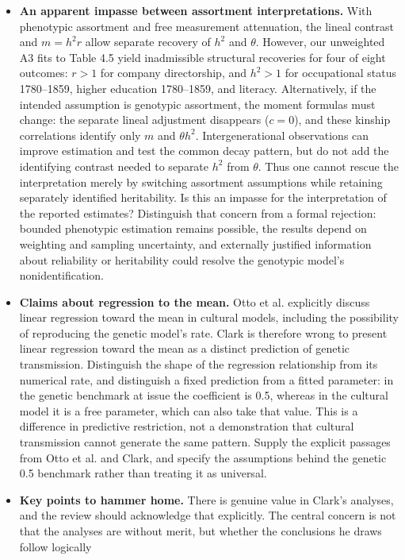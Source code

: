 \begin{itemize}
correlations inferred in Table 5.2.
\item \textbf{An apparent impasse between assortment interpretations.}
With phenotypic assortment and free measurement attenuation, the lineal
contrast and $m=h^2r$ allow separate recovery of $h^2$ and $\theta$.
However, our unweighted A3 fits to Table 4.5 yield inadmissible structural
recoveries for four of eight outcomes: $r>1$ for company directorship,
and $h^2>1$ for occupational status 1780--1859, higher education
1780--1859, and literacy. Alternatively, if the intended assumption is
genotypic assortment, the moment formulas must change: the separate
lineal adjustment disappears ($c=0$), and these kinship correlations
identify only $m$ and $\theta h^2$. Intergenerational observations can
improve estimation and test the common decay pattern, but do not add
the identifying contrast needed to separate $h^2$ from $\theta$.
Thus one cannot rescue the interpretation merely by switching assortment
assumptions while retaining separately identified heritability. Is this
an impasse for the interpretation of the reported estimates? Distinguish
that concern from a formal rejection: bounded phenotypic estimation
remains possible, the results depend on weighting and sampling uncertainty,
and externally justified information about reliability or heritability
could resolve the genotypic model's nonidentification.
\item \textbf{Claims about regression to the mean.}
Otto et al. explicitly discuss linear regression toward the mean in
cultural models, including the possibility of reproducing the genetic
model's rate. Clark is therefore wrong to present linear regression
toward the mean as a distinct prediction of genetic transmission.
Distinguish the shape of the regression relationship from its numerical
rate, and distinguish a fixed prediction from a fitted parameter: in the
genetic benchmark at issue the coefficient is 0.5, whereas in the cultural
model it is a free parameter, which can also take that value. This is a
difference in predictive restriction, not a demonstration that cultural
transmission cannot generate the same pattern. Supply the explicit
passages from Otto et al. and Clark, and specify the assumptions behind
the genetic 0.5 benchmark rather than treating it as universal.
\item \textbf{Key points to hammer home.}
There is genuine value in Clark's analyses, and the review should
acknowledge that explicitly. The central concern is not that the analyses
are without merit, but whether the conclusions he draws follow logically

\end{itemize}

